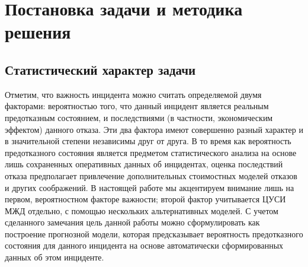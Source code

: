 
\section{Постановка задачи и методика решения}
\subsection{Статистический характер задачи}\label{sec:stat}
Отметим, что важность инцидента можно считать определяемой двумя факторами: вероятностью того, что данный инцидент является реальным предотказным состоянием, и последствиями (в частности, экономическим эффектом) данного отказа. Эти два фактора имеют совершенно разный характер и в значительной степени независимы друг от друга. В то время как вероятность предотказного состояния является предметом статистического анализа на основе лишь сохраненных оперативных данных об инцидентах, оценка последствий отказа предполагает привлечение дополнительных стоимостных моделей отказов и других соображений. В настоящей работе мы акцентируем внимание лишь на первом, вероятностном факторе важности; второй фактор учитывается ЦУСИ МЖД отдельно, с помощью нескольких альтернативных моделей.  
С учетом сделанного замечания цель данной работы можно сформулировать как построение прогнозной модели, которая предсказывает вероятность предотказного состояния для данного инцидента на основе автоматически сформированных данных об этом инциденте.


